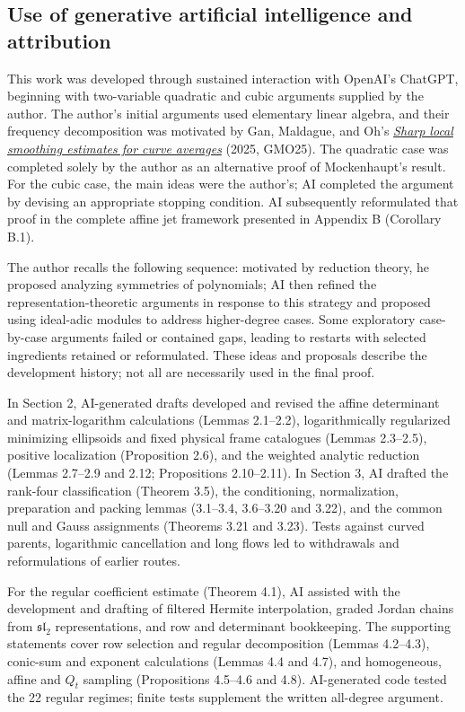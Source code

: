 \documentclass[11pt]{amsart}
\theoremstyle{definition}
\theoremstyle{remark}
\numberwithin{equation}{section}
\begin{document}
\subsection*{Use of generative artificial intelligence and attribution}
This work was developed through sustained interaction with OpenAI's ChatGPT, beginning with two-variable quadratic and cubic arguments supplied by the author. The author's initial arguments used elementary linear algebra, and their frequency decomposition was motivated by Gan, Maldague, and Oh's \href{https://arxiv.org/abs/2507.09696}{\emph{Sharp local smoothing estimates for curve averages}} (2025, GMO25). The quadratic case was completed solely by the author as an alternative proof of Mockenhaupt's result. For the cubic case, the main ideas were the author's; AI completed the argument by devising an appropriate stopping condition. AI subsequently reformulated that proof in the complete affine jet framework presented in Appendix B (Corollary B.1).

The author recalls the following sequence: motivated by reduction theory, he proposed analyzing symmetries of polynomials; AI then refined the representation-theoretic arguments in response to this strategy and proposed using ideal-adic modules to address higher-degree cases. Some exploratory case-by-case arguments failed or contained gaps, leading to restarts with selected ingredients retained or reformulated. These ideas and proposals describe the development history; not all are necessarily used in the final proof.

In Section 2, AI-generated drafts developed and revised the affine determinant and matrix-logarithm calculations (Lemmas 2.1--2.2), logarithmically regularized minimizing ellipsoids and fixed physical frame catalogues (Lemmas 2.3--2.5), positive localization (Proposition 2.6), and the weighted analytic reduction (Lemmas 2.7--2.9 and 2.12; Propositions 2.10--2.11). In Section 3, AI drafted the rank-four classification (Theorem 3.5), the conditioning, normalization, preparation and packing lemmas (3.1--3.4, 3.6--3.20 and 3.22), and the common null and Gauss assignments (Theorems 3.21 and 3.23). Tests against curved parents, logarithmic cancellation and long flows led to withdrawals and reformulations of earlier routes.

For the regular coefficient estimate (Theorem 4.1), AI assisted with the development and drafting of filtered Hermite interpolation, graded Jordan chains from \(\mathfrak{sl}_2\) representations, and row and determinant bookkeeping. The supporting statements cover row selection and regular decomposition (Lemmas 4.2--4.3), conic-sum and exponent calculations (Lemmas 4.4 and 4.7), and homogeneous, affine and \(Q_t\) sampling (Propositions 4.5--4.6 and 4.8). AI-generated code tested the 22 regular regimes; finite tests supplement the written all-degree argument.
\end{document}
